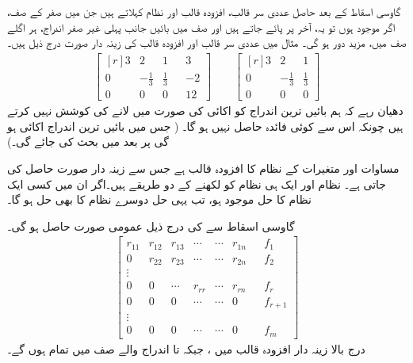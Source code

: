 گاوسی اسقاط کے بعد حاصل عددی سر قالب، افزودہ قالب اور نظام   کہلاتے ہیں جن میں صفر کے صف، اگر موجود ہوں تو یہ،  آخر پر پائے جاتے ہیں اور صف میں بائیں جانب پہلی غیر صفر اندراج، ہر اگلے صف میں، مزید دور ہو گی۔ مثال  میں عددی سر قالب اور افزودہ قالب کی زینہ دار صورت درج ذیل ہیں۔
\begin{align*}
\begin{bmatrix*}[r] 3&2&1&&3\\0&-\frac{1}{3}&\frac{1}{3}&&-2\\0&0&0&&12  \end{bmatrix*} \quad \quad \begin{bmatrix*}[r] 3&2&1\\0&-\frac{1}{3}&\frac{1}{3}\\0&0&0 \end{bmatrix*}
\end{align*}
دھیان رہے کہ ہم بائیں ترین اندراج کو اکائی  کی صورت میں لانے کی کوشش نہیں کرتے ہیں چونکہ اس سے کوئی فائدہ حاصل نہیں ہو گا۔  ( جس میں بائیں ترین اندراج اکائی ہو گی پر بعد میں بحث کی جائے گی۔)

 مساوات اور  متغیرات کے نظام کا افزودہ قالب  ہے جس سے  زینہ دار صورت
  حاصل کی جاتی ہے۔ نظام  اور  ایک ہی نظام کو لکھنے کے دو طریقے ہیں۔اگر ان میں کسی ایک نظام کا حل موجود ہو، تب یہی حل دوسرے نظام کا  بھی حل ہو گا۔

گاوسی اسقاط سے   کی درج ذیل عمومی صورت حاصل ہو گی۔
\begin{align*}
\begin{bmatrix}
r_{11}&r_{12}&r_{13}&\cdots&\cdots&r_{1n}&&f_1\\
0&r_{22}&r_{23}&\cdots&\cdots&r_{2n}&&f_2\\
\vdots\\
0&0&\cdots&r_{rr}&\cdots&r_{rn}&&f_r\\
0&0&0&\cdots&\cdots&0&&f_{r+1}\\
\vdots\\
0&0&0&\cdots&\cdots&0&&f_m
\end{bmatrix}
\end{align*} 
درج بالا زینہ دار افزودہ قالب میں ،   جبکہ   تا  اندراج والے صف میں تمام  ہوں گے۔

